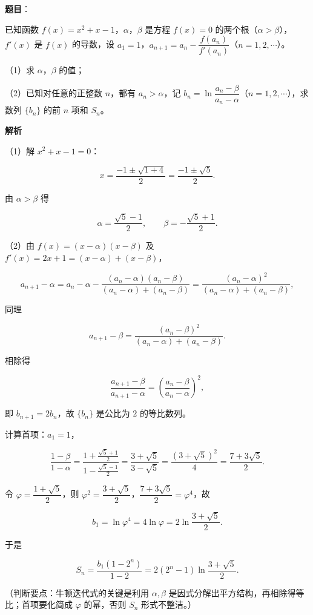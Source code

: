 \begin{answer}

\textbf{题目}：

已知函数 $f(x)=x^2+x-1$，$\alpha$，$\beta$ 是方程 $f(x)=0$ 的两个根（$\alpha>\beta$），$f'(x)$ 是 $f(x)$ 的导数，设 $a_1=1$，$a_{n+1}=a_n-\dfrac{f(a_n)}{f'(a_n)}$（$n=1,2,\cdots$）。

（1）求 $\alpha$，$\beta$ 的值；

（2）已知对任意的正整数 $n$，都有 $a_n>\alpha$，记 $b_n=\ln\dfrac{a_n-\beta}{a_n-\alpha}$（$n=1,2,\cdots$），求数列 $\{b_n\}$ 的前 $n$ 项和 $S_n$。

\textbf{解析}

（1）解 $x^2+x-1=0$：

\nopagebreak[4]
\[x=\frac{-1\pm\sqrt{1+4}}{2}=\frac{-1\pm\sqrt5}{2}.\]

由 $\alpha>\beta$ 得

\nopagebreak[4]
\[\alpha=\frac{\sqrt5-1}{2},\qquad \beta=-\frac{\sqrt5+1}{2}.\]

（2）由 $f(x)=(x-\alpha)(x-\beta)$ 及 $f'(x)=2x+1=(x-\alpha)+(x-\beta)$，

\nopagebreak[4]
\[a_{n+1}-\alpha=a_n-\alpha-\frac{(a_n-\alpha)(a_n-\beta)}{(a_n-\alpha)+(a_n-\beta)}=\frac{(a_n-\alpha)^2}{(a_n-\alpha)+(a_n-\beta)},\]

同理

\nopagebreak[4]
\[a_{n+1}-\beta=\frac{(a_n-\beta)^2}{(a_n-\alpha)+(a_n-\beta)}.\]

相除得

\nopagebreak[4]
\[\frac{a_{n+1}-\beta}{a_{n+1}-\alpha}=\left(\frac{a_n-\beta}{a_n-\alpha}\right)^2,\]

即 $b_{n+1}=2b_n$，故 $\{b_n\}$ 是公比为 $2$ 的等比数列。

计算首项：$a_1=1$，

\nopagebreak[4]
\[\frac{1-\beta}{1-\alpha}=\frac{1+\frac{\sqrt5+1}{2}}{1-\frac{\sqrt5-1}{2}}=\frac{3+\sqrt5}{3-\sqrt5}=\frac{(3+\sqrt5)^2}{4}=\frac{7+3\sqrt5}{2}.\]

令 $\varphi=\dfrac{1+\sqrt5}{2}$，则 $\varphi^2=\dfrac{3+\sqrt5}{2}$，$\dfrac{7+3\sqrt5}{2}=\varphi^4$，故

\nopagebreak[4]
\[b_1=\ln\varphi^4=4\ln\varphi=2\ln\frac{3+\sqrt5}{2}.\]

于是

\nopagebreak[4]
\[S_n=\frac{b_1(1-2^n)}{1-2}=2(2^n-1)\ln\frac{3+\sqrt5}{2}.\]

（判断要点：牛顿迭代式的关键是利用 $\alpha,\beta$ 是因式分解出平方结构，再相除得等比；首项要化简成 $\varphi$ 的幂，否则 $S_n$ 形式不整洁。）


\end{answer}
